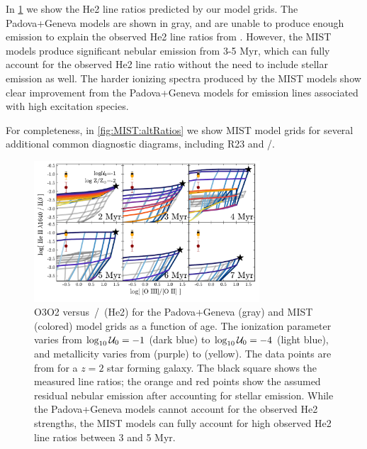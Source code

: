 In \ref{fig:MIST:HeII} we show the He2 line ratios predicted by our model grids. The Padova+Geneva models are shown in gray, and are unable to produce enough \heii emission to explain the observed He2 line ratios from \citet{Steidel16}. However, the MIST models produce significant nebular \heii emission from 3-5 Myr, which can fully account for the observed He2 line ratio without the need to include stellar emission as well. The harder ionizing spectra produced by the MIST models show clear improvement from the Padova+Geneva models for emission lines associated with high excitation species.

For completeness, in \ref{fig:MIST:altRatios} we show MIST model grids for several additional common diagnostic diagrams, including R23 and \sii{}/\ha{}. 
\begin{figure}[!htbp]
  \begin{centering}
    \includegraphics[width=0.75\textwidth]{manuscript/chapter2/f25.pdf}
    \caption{O3O2 versus \heii{}\,/\,\hb{} (He2) for the Padova+Geneva (gray) and MIST (colored) model grids as a function of age. The ionization parameter varies from $\log_{10} \mathcal{U}_0{}=-1$ (dark blue) to $\log_{10} \mathcal{U}_0{}=-4$ (light blue), and metallicity varies from  (purple) to  (yellow). The data points are from \citet{Steidel16} for a $z=2$ star forming galaxy. The black square shows the measured line ratios; the orange and red points show the assumed residual nebular \heii{} emission after accounting for stellar \heii{} emission. While the Padova+Geneva models cannot account for the observed He2 strengths, the MIST models can fully account for high observed He2 line ratios between 3 and 5 Myr.}
    \label{fig:MIST:HeII}
  \end{centering}
\end{figure}
